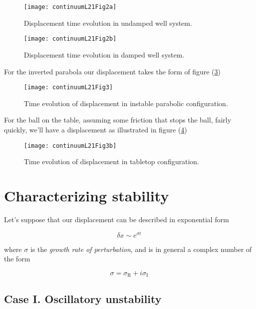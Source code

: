 \begin{figure}[htp]
   \centering
   \texttt{[image: continuumL21Fig2a]}
   \caption{Displacement time evolution in undamped well system.}\label{fig:continuumL21:continuumL21Fig2a}
\end{figure}
\begin{figure}[htp]
   \centering
   \texttt{[image: continuumL21Fig2b]}
   \caption{Displacement time evolution in damped well system.}\label{fig:continuumL21:continuumL21Fig2b}
\end{figure}

For the inverted parabola our displacement takes the form of figure (\ref{fig:continuumL21:continuumL21Fig3})
\begin{figure}[htp]
   \centering
   \texttt{[image: continuumL21Fig3]}
   \caption{Time evolution of displacement in instable parabolic configuration.}\label{fig:continuumL21:continuumL21Fig3}
\end{figure}

For the ball on the table, assuming some friction that stops the ball, fairly quickly, we'll have a displacement as illustrated in figure (\ref{fig:continuumL21:continuumL21Fig3b})
\begin{figure}[htp]
   \centering
   \texttt{[image: continuumL21Fig3b]}
   \caption{Time evolution of displacement in tabletop configuration.}\label{fig:continuumL21:continuumL21Fig3b}
\end{figure}

\section{Characterizing stability}

Let's suppose that our displacement can be described in exponential form

\begin{equation}\label{eqn:continuumL21:10}
\delta x \sim e^{\sigma t}
\end{equation}

where $\sigma$ is the \textit{growth rate of perturbation}, and is in general a complex number of the form

\begin{equation}\label{eqn:continuumL21:30}
\sigma = \sigma_\text{R} + i \sigma_\text{I}
\end{equation}

\subsection{Case I.  Oscillatory unstability}

